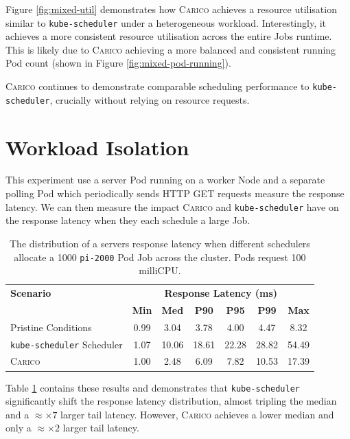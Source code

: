 Figure \ref{fig:mixed-util} demonstrates how \textsc{Carico} achieves a resource
utilisation similar to \texttt{kube-scheduler} under a heterogeneous workload.
Interestingly, it achieves a more consistent resource utilisation across the
entire Jobs runtime. This is likely due to \textsc{Carico} achieving a more
balanced and consistent running Pod count (shown in Figure
\ref{fig:mixed-pod-running}).

\textsc{Carico} continues to demonstrate comparable scheduling performance to
\texttt{kube-scheduler}, crucially without relying on resource requests.

\section{Workload Isolation}
\label{sec:eval-isolation}
This experiment use a server Pod running on a worker Node and a separate polling
Pod which periodically sends HTTP GET requests measure the response latency. We
can then measure the impact \textsc{Carico} and \texttt{kube-scheduler} have on
the response latency when they each schedule a large Job.

\begin{table}[h!]
\centering
    \begin{tabular}{|l|c|c|c|c|c|c|}
    \hline
    \textbf{Scenario} & \multicolumn{6}{c|}{\textbf{Response Latency (ms)}} \\
    \cline{2-7}
    & \textbf{Min} & \textbf{Med} & \textbf{P90} & \textbf{P95} & \textbf{P99} & \textbf{Max} \\
    \hline
    Pristine Conditions & 0.99 & 3.04 & 3.78 & 4.00 & 4.47 & 8.32 \\
    \texttt{kube-scheduler} Scheduler & 1.07 & 10.06 & 18.61 & 22.28 & 28.82 & 54.49\\
    \textsc{Carico}  & 1.00 & 2.48 & 6.09 & 7.82 & 10.53 & 17.39\\
    \hline
    \end{tabular}
    \caption{The distribution of a servers response latency when different
    schedulers allocate a 1000 \texttt{pi-2000} Pod Job across the cluster. Pods
    request 100 milliCPU.}
    \label{tab:impacted-latency}
\end{table}

Table \ref{tab:impacted-latency} contains these results and demonstrates that
\texttt{kube-scheduler} significantly shift the response latency distribution,
almost tripling the median and a $\approx \times 7$ larger tail latency.
However, \textsc{Carico} achieves a lower median and only a $\approx \times2$
larger tail latency.


